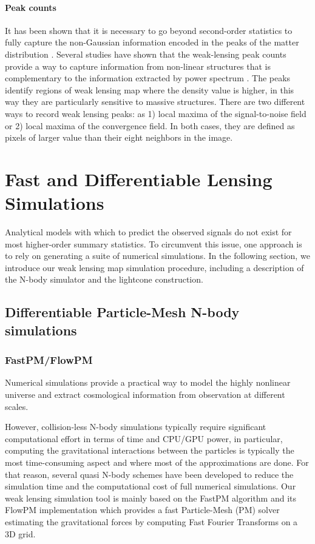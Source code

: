 \documentclass{aa}
\begin{document}
\paragraph{Peak counts}It has been shown that it is necessary to go beyond second-order statistics to fully capture the non-Gaussian information encoded in the peaks of the matter distribution 
\citep{1997A&A...322....1B, 1997ApJ...484..560J,1999A&A...342...15V,2003A&A...397..809S}. Several studies have shown that the weak-lensing peak counts provide a way to capture information from non-linear structures that is complementary to the information extracted by power spectrum \citep{lin2015new, peel2017cosmological, ajani2020constraining, harnois2021cosmic, zurcher2022dark}.
The peaks identify regions of weak lensing map where the density value is higher, in this way they are particularly sensitive to massive structures.
There are two different ways to record weak lensing peaks: as 1) local maxima of the signal-to-noise field or 2) local maxima of the convergence field. In both cases, they are defined as pixels of larger value than their eight neighbors in the image.


\section{Fast and Differentiable Lensing Simulations}\label{Fast_and_Differentiable_Lensing_Simulations}
Analytical models with which to predict the observed signals do not exist for most higher-order summary statistics. 
To circumvent this issue, one approach is to rely on generating a suite of numerical simulations.
In the following section, we introduce our weak lensing map simulation procedure, including a description of the N-body simulator and the lightcone construction.

\subsection{Differentiable Particle-Mesh N-body simulations}
\subsubsection{FastPM/FlowPM}

Numerical simulations provide a practical way to model the highly nonlinear universe and extract cosmological information from observation at different scales. 

However, collision-less N-body simulations typically require significant computational effort in terms of time and CPU/GPU power, in particular, computing the gravitational interactions between the particles is typically the most time-consuming aspect and where most of the approximations are done. 
For that reason, several quasi N-body schemes have been developed to reduce the simulation time and the computational cost of full numerical simulations. 
Our weak lensing simulation tool is mainly based on the FastPM algorithm \citep{2019ascl.soft05010F} and its FlowPM \citep{modi2021flowpm} implementation which provides a fast Particle-Mesh (PM) solver estimating the gravitational forces by computing Fast Fourier Transforms on a 3D grid.
\end{document}
